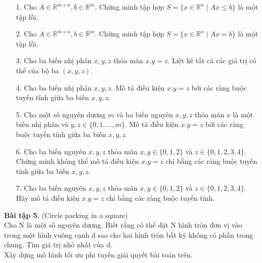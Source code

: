 \documentclass[12pt]{article}
\newcommand{\R}{\mathbb{R}}
\begin{document}
    \begin{enumerate}
        \item[1.] Cho $A \in \R^{m \times n}, b \in \R^m$. Chứng minh tập hợp $S = \{x \in \R^n \mid Ax \leq b\}$ là một tập lồi.
        \item[2.] Cho $A \in \R^{m \times n}, b \in \R^m$. Chứng minh tập hợp $S = \{x \in \R^n \mid Ax = b\}$ là một tập lồi.
        \item[3.] Cho ba biến nhị phân $x, y, z$ thỏa mãn $x.y = z$. Liệt kê tất cả các giá trị có thể của bộ ba $(x, y, z)$.
        \item[4.] Cho ba biến nhị phân $x, y, z$. Mô tả điều kiện $x.y = z$ bởi các ràng buộc tuyến tính giữa ba biến $x, y, z$.
        \item[5.] Cho một số nguyên dương $m$ và ba biến nguyên $x, y, z$ thỏa mãn $x$ là một biến nhị phân và $y, z \in \{0, 1, \dots, m\}$. Mô tả điều kiện $x.y = z$ bởi các ràng buộc tuyến tính giữa ba biến $x, y, z$.
        \item[6.] Cho ba biến nguyên $x, y, z$ thỏa mãn $x, y \in \{0, 1, 2\}$ và $z \in \{0, 1, 2, 3, 4\}$. Chứng minh không thể mô tả điều kiện $x.y = z$ chỉ bằng các ràng buộc tuyến tính giữa ba biến $x, y, z$.
        \item[7.] Cho ba biến nguyên $x, y, z$ thỏa mãn $x, y \in \{0, 1, 2\}$ và $z \in \{0, 1, 2, 3, 4\}$. Hãy mô tả điều kiện $x.y = z$ chỉ bằng các ràng buộc tuyến tính.
    \end{enumerate}
    \textbf{Bài tập 5.} (Circle packing in a square)
    \\
    Cho N là một số nguyên dương. Biết rằng có thể đặt N hình tròn đơn vị vào trong một
    hình vuông cạnh d sao cho hai hình tròn bất kỳ không có phần trong chung. Tìm giá trị nhỏ nhất
    của d.
    \\
    Xây dựng mô hình tối ưu phi tuyến giải quyết bài toán trên.
\end{document}
